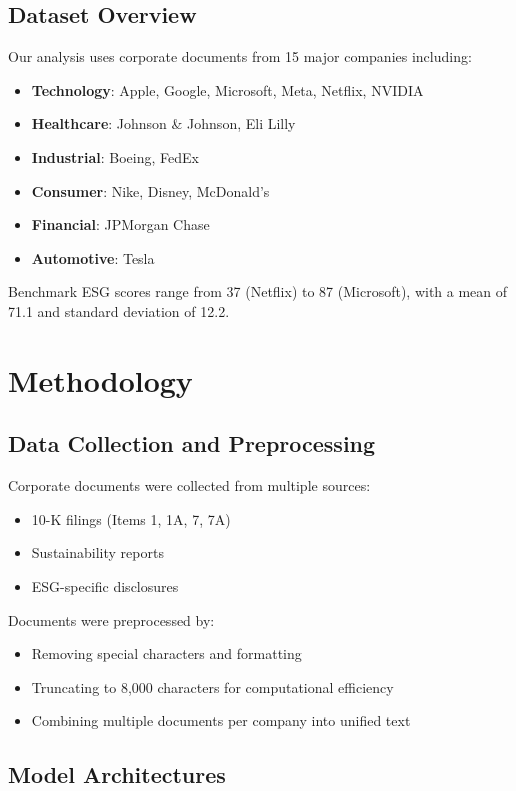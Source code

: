 \documentclass[12pt,a4paper]{article}
\begin{document}
\subsection{Dataset Overview}
Our analysis uses corporate documents from 15 major companies including:
\begin{itemize}
    \item \textbf{Technology}: Apple, Google, Microsoft, Meta, Netflix, NVIDIA
    \item \textbf{Healthcare}: Johnson \& Johnson, Eli Lilly
    \item \textbf{Industrial}: Boeing, FedEx
    \item \textbf{Consumer}: Nike, Disney, McDonald's
    \item \textbf{Financial}: JPMorgan Chase
    \item \textbf{Automotive}: Tesla
\end{itemize}

Benchmark ESG scores range from 37 (Netflix) to 87 (Microsoft), with a mean of 71.1 and standard deviation of 12.2.

\section{Methodology}

\subsection{Data Collection and Preprocessing}
Corporate documents were collected from multiple sources:
\begin{itemize}
    \item 10-K filings (Items 1, 1A, 7, 7A)
    \item Sustainability reports
    \item ESG-specific disclosures
\end{itemize}

Documents were preprocessed by:
\begin{itemize}
    \item Removing special characters and formatting
    \item Truncating to 8,000 characters for computational efficiency
    \item Combining multiple documents per company into unified text
\end{itemize}

\subsection{Model Architectures}
\end{document}
